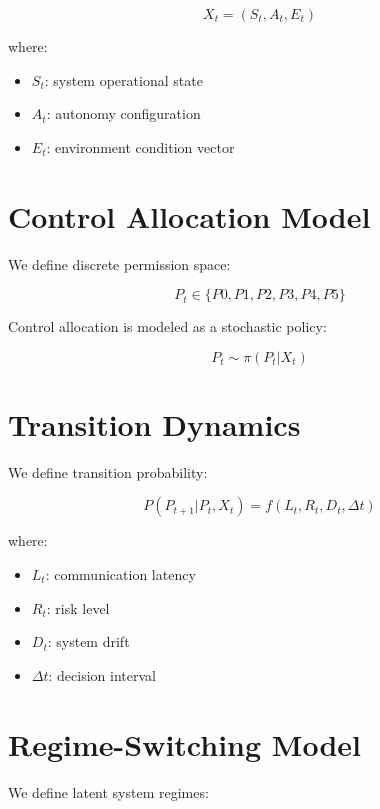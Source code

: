 \documentclass[conference]{IEEEtran}
\begin{document}
\begin{equation}
X_t = (S_t, A_t, E_t)
\end{equation}

where:
\begin{itemize}
\item $S_t$: system operational state
\item $A_t$: autonomy configuration
\item $E_t$: environment condition vector
\end{itemize}

\section{Control Allocation Model}

We define discrete permission space:

\begin{equation}
P_t \in \{P0, P1, P2, P3, P4, P5\}
\end{equation}

Control allocation is modeled as a stochastic policy:

\begin{equation}
P_t \sim \pi(P_t | X_t)
\end{equation}

\section{Transition Dynamics}

We define transition probability:

\begin{equation}
P(P_{t+1} | P_t, X_t) = f(L_t, R_t, D_t, \Delta t)
\end{equation}

where:
\begin{itemize}
\item $L_t$: communication latency
\item $R_t$: risk level
\item $D_t$: system drift
\item $\Delta t$: decision interval
\end{itemize}

\section{Regime-Switching Model}

We define latent system regimes:
\end{document}
